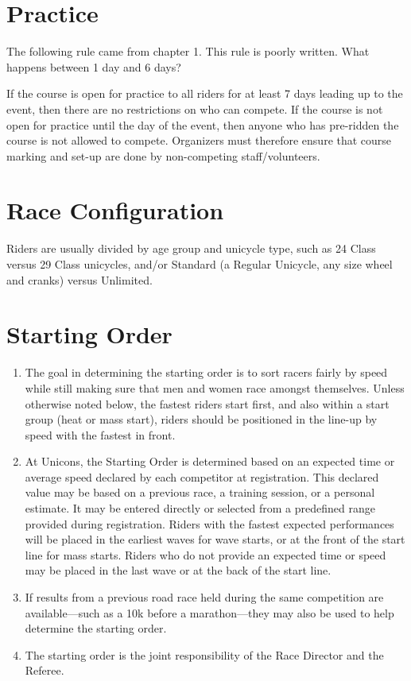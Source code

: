 \section{Practice}

\begin{comment2016}
The following rule came from chapter 1.
This rule is poorly written.
What happens between 1 day and 6 days?
\end{comment2016}

If the course is open for practice to all riders for at least 7 days leading up to the event, then there are no restrictions on who can compete.
If the course is not open for practice until the day of the event, then anyone who has pre-ridden the course is not allowed to compete.
Organizers must therefore ensure that course marking and set-up are done by non-competing staff/volunteers.

\section{Race Configuration}

Riders are usually divided by age group and unicycle type, such as 24 Class versus 29 Class unicycles, 
and/or Standard (a Regular Unicycle, any size wheel and cranks) versus Unlimited.

\section{Starting Order}

\begin{enumerate}[leftmargin=1.5em,labelsep=*]
	\item The goal in determining the starting order is to sort racers fairly by speed while still making sure that men and women race amongst themselves.
	Unless otherwise noted below, the fastest riders start first, and also within a start group (heat or mass start), 
  riders should be positioned in the line-up by speed with the fastest in front.
	\item At Unicons, the Starting Order is determined based on an expected time or average speed declared by each competitor at registration. 
  This declared value may be based on a previous race, a training session, or a personal estimate. 
  It may be entered directly or selected from a predefined range provided during registration. 
  Riders with the fastest expected performances will be placed in the earliest waves for wave starts, or at the front of the start line for mass starts. 
  Riders who do not provide an expected time or speed may be placed in the last wave or at the back of the start line.
	\item If results from a previous road race held during the same competition are available—such as a 10k before a 
  marathon—they may also be used to help determine the starting order.
	\item The starting order is the joint responsibility of the Race Director and the Referee.
\end{enumerate}

